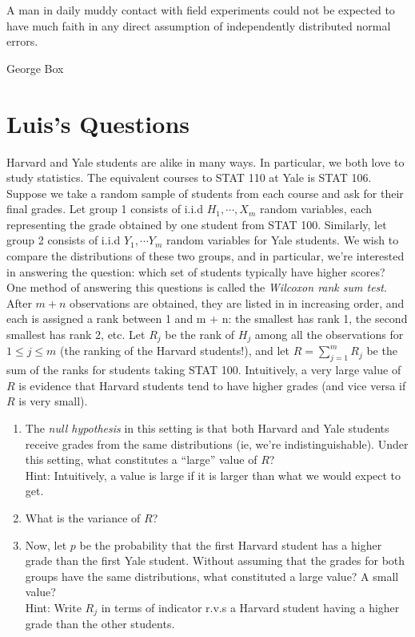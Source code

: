 \documentclass[11pt]{article}
\begin{document}


\setlength{\epigraphwidth}{.6\textwidth}
\epigraph{A man in daily muddy contact with field experiments could not be expected to have much faith in any direct assumption of independently distributed normal errors.}{George Box}

\section*{Luis's Questions}
\begin{exercise}
Harvard and Yale students are alike in many ways. In particular, we both love to study statistics. The equivalent courses to STAT 110 at Yale is STAT 106. Suppose we take a random sample of students from each course and ask for their final grades. Let group 1 consists of i.i.d $H_1, \cdots, X_m$ random variables, each representing the grade obtained by one student from STAT 100. Similarly, let group 2 consists of i.i.d $Y_1, \cdots Y_m$ random variables for Yale students. We wish to compare the distributions of these two groups, and in particular, we're interested in answering the question: which set of students typically have higher scores?\\

One method of answering this questions is called the \textit{Wilcoxon rank sum test}. After $m+n$ observations are obtained, they are listed in in increasing order, and each is assigned a rank between 1 and m + n: the smallest has rank 1, the second smallest has rank 2, etc. Let $R_j$ be the rank of $H_j$ among all the observations for $1 \leq j \leq m$ (the ranking of the Harvard students!), and let $R = \sum_{j=1}^{m} R_j$ be the sum of the ranks for students taking STAT 100.
Intuitively, a very large value of $R$ is evidence that Harvard students tend to have higher grades (and vice versa if $R$ is very small).

\begin{enumerate}
\item The \textit{null hypothesis} in this setting is that both Harvard and Yale students receive grades from the same distributions (ie, we're indistinguishable). Under this setting, what constitutes a ``large'' value of $R$? \\
Hint: Intuitively, a value is large if it is larger than what we would expect to get.
\item What is the variance of $R$?
\item Now, let $p$ be the probability that the first Harvard student has a higher grade than the first Yale student. Without assuming that the grades for both groups have the same distributions, what constituted a large value? A small value?\\
Hint: Write $R_j$ in terms of indicator r.v.s a Harvard student having a higher grade than the other students.
\end{enumerate}
\end{exercise}
\end{document}
